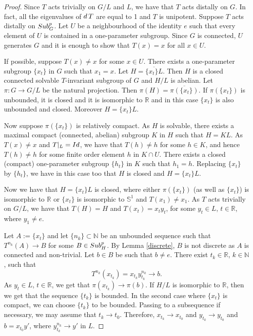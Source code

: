 \documentclass[10pt,a4paper]{amsart}
\let\ol=\overline
\newcommand{\Id}{{\rm Id}}
\newcommand{\N}{{\mathbb N}}
\newcommand{\R}{{\mathbb R}}
\newcommand{\Sc}{{\mathbb S}}
\newcommand{\du}{{\rm d\,}}
\newcommand{\spg}{{\rm Sub}^p_G}
\newcommand{\spp}{{\rm Sub}^{p}}
\begin{document}
\begin{proof} Since $T$ acts trivially on $G/L$ and $L$, we have that $T$ acts distally on $G$. In fact, all the eigenvalues 
of $\du T$ are equal to 1 and $T$ is unipotent. Suppose $T$ acts distally on $\spg$. Let $U$ be a neighbourhood 
of the identity $e$ such that every element of $U$ is contained in a one-parameter subgroup. Since $G$ is 
connected, $U$ generates $G$ and it is enough to show that $T(x)=x$ for all $x\in U$. 
 
\smallskip
  If possible, suppose $T(x)\ne x$ for some $x\in U$. There exists a one-parameter 
 subgroup $\{x_t\}$ in $G$ such that $x_1=x$. Let $H=\ol{\{x_t\}L}$. Then $H$ is a closed connected solvable $T$-invariant 
 subgroup of $G$ and $H/L$ is abelian. Let $\pi:G\to G/L$ be the natural projection.  
 Then $\pi(H)=\ol{\pi(\{x_t\})}$. If $\pi(\{x_t\})$ is unbounded, it is closed and it is isomorphic to $\R$ and in this case 
 $\{x_t\}$ is also unbounded and closed. Moreover $H=\{x_t\}L$.
 
Now suppose $\pi(\{x_t\})$ is relatively compact. As $H$ is solvable, there exists a maximal compact 
(connected, abelian) subgroup $K$ in $H$ such that $H=KL$. As $T(x)\ne x$ and $T|_L=\Id$, 
we have that $T(h)\ne h$ for some $h\in K$, and hence $T(h)\ne h$ for some finite order element $h$ in $K\cap U$.
There exists a closed (compact) one-parameter subgroup $\{h_t\}$ in $K$ such that $h_1=h$. Replacing 
$\{x_t\}$ by $\{h_t\}$, we have in this case too that $H$ is closed and $H=\{x_t\}L$.

Now we have that $H=\{x_t\}L$ is closed, where either $\pi(\{x_t\})$ (as well as $\{x_t\}$) is isomorphic to $\R$ 
or $\{x_t\}$ is isomorphic to $\Sc^1$ and $T(x_1)\ne x_1$. As $T$ acts trivially on $G/L$, we have that $T(H)=H$ 
and $T(x_t)=x_ty_t$, for some $y_t\in L$, $t\in\R$, where $y_1\ne e$. 

 \smallskip
  Let $A:=\{x_t\}$ and let $\{n_k\}\subset\N$ be an unbounded sequence 
such that $T^{n_k}(A)\to B$ for some $B\in\spp_H$. By Lemma \ref{discrete}, $B$ is not discrete as $A$ 
is connected and non-trivial. Let $b\in B$ be such that $b\ne e$. There exist $t_k\in\R$, $k\in\N$, 
such that 
$$
T^{n_k}(x_{t_k})=x_{t_k}y_{t_k}^{n_k}\to b.$$ 
 As $y_t\in L$, $t\in\R$, we get that $\pi(x_{t_k})\to\pi(b)$. If $H/L$ is isomorphic to $\R$, 
then we get that the sequence $\{t_k\}$ is bounded. In the second case where $\{x_t\}$ is compact, we 
can choose $\{t_k\}$ to be bounded. Passing to a subsequence if necessary, we may assume that 
$t_k\to t_0$. Therefore, $x_{t_k}\to x_{t_0}$ and $y_{t_k}\to y_{t_0}$ and 
$b=x_{t_0}y'$, where $y_{t_k}^{n_k}\to y'$ in $L$. 


\end{proof}
\end{document}
